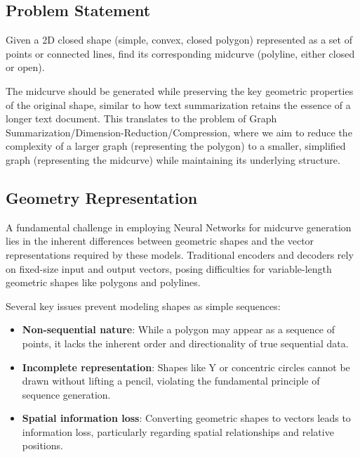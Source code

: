 \documentclass[10pt, conference]{IEEEtran}
\begin{document}
\subsection{Problem Statement}
\label{subsec:3}

Given a 2D closed shape (simple, convex, closed polygon) represented as a set of points or connected lines, find its corresponding midcurve (polyline, either closed or open).

The midcurve should be generated while preserving the key geometric properties of the original shape, similar to how text summarization retains the essence of a longer text document. This translates to the problem of Graph Summarization/Dimension-Reduction/Compression, where we aim to reduce the complexity of a larger graph (representing the polygon) to a smaller, simplified graph (representing the midcurve) while maintaining its underlying structure.

\subsection{Geometry Representation}
\label{subsec:4}

A fundamental challenge in employing Neural Networks for midcurve generation lies in the inherent differences between geometric shapes and the vector representations required by these models. Traditional encoders and decoders rely on fixed-size input and output vectors, posing difficulties for variable-length geometric shapes like polygons and polylines.

Several key issues prevent modeling shapes as simple sequences:
\begin{itemize}
\item {\bf Non-sequential nature}: While a polygon may appear as a sequence of points, it lacks the inherent order and directionality of true sequential data.
\item {\bf Incomplete representation}: Shapes like Y or concentric circles cannot be drawn without lifting a pencil, violating the fundamental principle of sequence generation.
\item {\bf Spatial information loss}: Converting geometric shapes to vectors leads to information loss, particularly regarding spatial relationships and relative positions.
\end{itemize}
\end{document}
